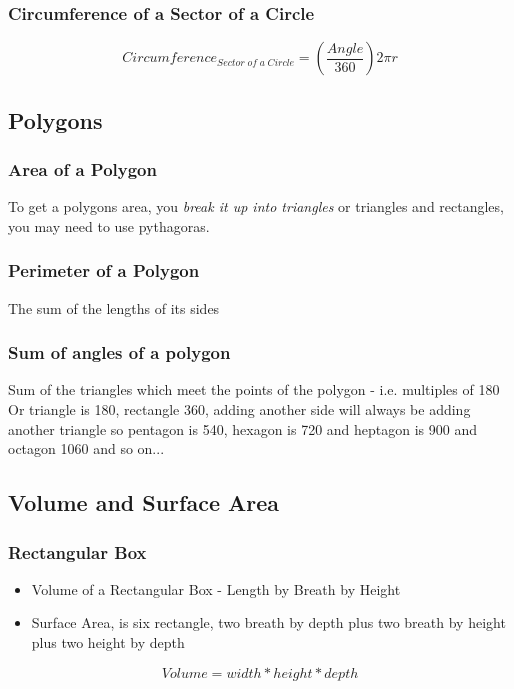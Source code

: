\documentclass{article}
\begin{document}
\subsubsection{Circumference of a Sector of a Circle}
\begin{equation}
Circumference_{ Sector\;of\;a\;Circle} = ( \frac{Angle }{ 360} ) 2 \pi r
\end{equation}

\subsection{Polygons}
\subsubsection{Area of a Polygon}
To get a polygons area, you \textit{break it up into triangles} or triangles and rectangles, you may need to use pythagoras.
\subsubsection{Perimeter of a Polygon}
The sum of the lengths of its sides
\subsubsection{Sum of angles of a polygon}
Sum of the triangles which meet the points of the polygon - i.e. multiples of 180
Or triangle is 180, rectangle 360, adding another side will always be adding another triangle so
pentagon is 540, hexagon is 720 and heptagon is 900 and octagon 1060 and so on...


\newpage
\subsection{Volume and Surface Area}
\subsubsection{Rectangular Box}
\begin{itemize}
\item Volume of a Rectangular Box - Length by Breath by Height
\item Surface Area, is six rectangle, two breath by depth plus two breath by height plus two height by depth
\end{itemize}

\begin{equation}
Volume = width * height * depth
\end{equation}
\end{document}
